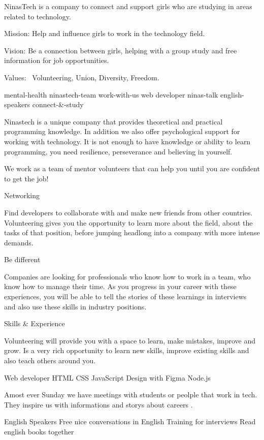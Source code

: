 NinasTech is a company to connect and support  girls 
who are studying in areas related to technology.

Mission: Help and influence girls to work in the technology field.

Vision: Be a connection between  girls, helping with a group study and free information for job opportunities.

Values:  Volunteering, Union, Diversity, Freedom.

mental-health
ninastech-team
work-with-us
web developer
ninas-talk
english-speakers
connect-&-study

Ninastech is a unique company that provides theoretical and practical programming knowledge. 
In addition  we also offer psychological support for working with technology.
It is not enough to have knowledge or ability to learn programming, you need resilience, perseverance and believing in yourself.


We work as a team of mentor volunteers that can help you until you are confident to get the job!


Networking
 
Find developers to collaborate with and make new friends from other countries. 
Volunteering  gives you the opportunity to learn more about the field, about the tasks of that position, before jumping headlong into a company with more intense demands.

Be different

Companies are looking for professionals who know how to work in a team,  who know how to manage their time. As you progress in your career with these experiences, you will be able to tell the stories of these learnings in interviews and also use these skills in industry positions. 

Skills & Experience 

Volunteering will provide you with a space to learn, make mistakes, improve and grow. Is a very rich opportunity  to learn new skills, improve existing skills and also teach others around you.  

Web developer 
HTML
CSS
JavaScript
Design with Figma
Node.js 


Amost ever Sunday we have meetings with students or peolple that work in tech. They inspire us with informations and storys about careers .

English Speakers
Free nice conversations in English
Training for interviews
Read english books together  
